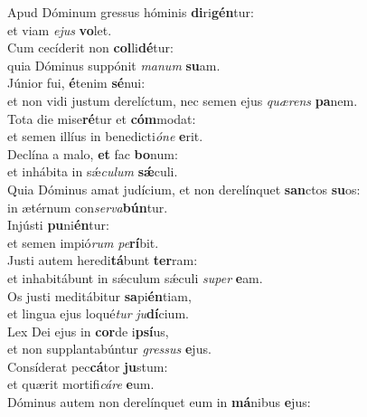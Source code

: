 \evenverse Apud Dóminum gressus hóminis \textbf{di}ri\textbf{gén}tur:~\*\\
\evenverse et viam \textit{e}\textit{jus} \textbf{vo}let.\\
\oddverse Cum cecíderit non \textbf{col}li\textbf{dé}tur:~\*\\
\oddverse quia Dóminus suppónit \textit{ma}\textit{num} \textbf{su}am.\\
\evenverse Júnior fui, \textbf{é}tenim \textbf{sé}nui:~\*\\
\evenverse et non vidi justum derelíctum, nec semen ejus \textit{quæ}\textit{rens} \textbf{pa}nem.\\
\oddverse Tota die mise\textbf{ré}tur et \textbf{cóm}modat:~\*\\
\oddverse et semen illíus in benedicti\textit{ó}\textit{ne} \textbf{e}rit.\\
\evenverse Declína a malo, \textbf{et} fac \textbf{bo}num:~\*\\
\evenverse et inhábita in sǽ\textit{cu}\textit{lum} \textbf{sǽ}culi.\\
\oddverse Quia Dóminus amat judícium, et non derelínquet \textbf{san}ctos \textbf{su}os:~\*\\
\oddverse in ætérnum con\textit{ser}\textit{va}\textbf{bún}tur.\\
\evenverse Injústi \textbf{pu}ni\textbf{én}tur:~\*\\
\evenverse et semen impió\textit{rum} \textit{pe}\textbf{rí}bit.\\
\oddverse Justi autem heredi\textbf{tá}bunt \textbf{ter}ram:~\*\\
\oddverse et inhabitábunt in sǽculum sǽculi \textit{su}\textit{per} \textbf{e}am.\\
\evenverse Os justi meditábitur \textbf{sa}pi\textbf{én}tiam,~\*\\
\evenverse et lingua ejus loqué\textit{tur} \textit{ju}\textbf{dí}cium.\\
\oddverse Lex Dei ejus in \textbf{cor}de i\textbf{psí}us,~\*\\
\oddverse et non supplantabúntur \textit{gres}\textit{sus} \textbf{e}jus.\\
\evenverse Consíderat pec\textbf{cá}tor \textbf{ju}stum:~\*\\
\evenverse et quærit mortifi\textit{cá}\textit{re} \textbf{e}um.\\
\oddverse Dóminus autem non derelínquet eum in \textbf{má}nibus \textbf{e}jus:~\*\\
